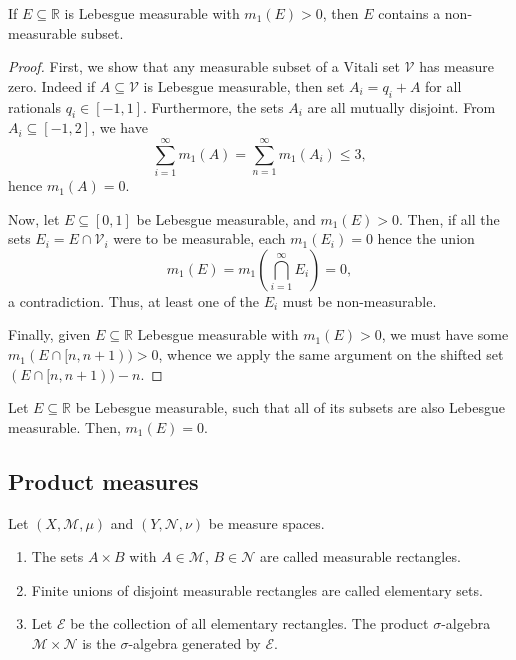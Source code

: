 \documentclass[11pt]{article}
\newcommand{\R}{\mathbb{R}}
\newcommand{\M}{\mathcal{M}}
\newcommand{\MN}{\mathcal{N}}
\theoremstyle{definition}
\theoremstyle{remark}
\numberwithin{equation}{section}
\begin{document}
    \begin{theorem}
        If $E \subseteq \R$ is Lebesgue measurable with $m_1(E) > 0$, then $E$
        contains a non-measurable subset.
    \end{theorem}
    \begin{proof}
        First, we show that any measurable subset of a Vitali set $\mathcal{V}$ has
        measure zero. Indeed if $A \subseteq \mathcal{V}$ is Lebesgue measurable,
        then set $A_i = q_i + A$ for all rationals $q_i \in [-1, 1]$. Furthermore,
        the sets $A_i$ are all mutually disjoint. From $A_i \subseteq [-1, 2]$, we
        have \[
            \sum_{i = 1}^\infty m_1(A) = \sum_{n = 1}^\infty m_1(A_i) \leq 3,
        \] hence $m_1(A) = 0$.

        Now, let $E \subseteq [0, 1]$ be Lebesgue measurable, and $m_1(E) > 0$. Then,
        if all the sets $E_i = E \cap \mathcal{V}_i$ were to be measurable, each
        $m_1(E_i) = 0$ hence the union \[
            m_1(E) = m_1\left(\bigcap_{i = 1}^\infty E_i\right) = 0,
        \] a contradiction. Thus, at least one of the $E_i$ must be non-measurable.

        Finally, given $E \subseteq \R$ Lebesgue measurable with $m_1(E) > 0$, we
        must have some $m_1(E \cap [n, n + 1)) > 0$, whence we apply the same
        argument on the shifted set $(E \cap [n, n + 1)) - n$.
    \end{proof}
    \begin{corollary}
        Let $E \subseteq \R$ be Lebesgue measurable, such that all of its subsets
        are also Lebesgue measurable. Then, $m_1(E) = 0$.
    \end{corollary}



    \subsection{Product measures}

    \begin{definition}
        Let $(X, \M, \mu)$ and $(Y, \MN, \nu)$ be measure spaces.
        \begin{enumerate}
            \itemsep0em
            \item The sets $A \times B$ with $A \in \M$, $B \in \MN$ are called
            measurable rectangles.
            \item Finite unions of disjoint measurable rectangles are called
            elementary sets.
            \item Let $\mathcal{E}$ be the collection of all elementary rectangles.
            The product $\sigma$-algebra $\M \times \MN$ is the $\sigma$-algebra
            generated by $\mathcal{E}$.
        \end{enumerate}
    \end{definition}
\end{document}
